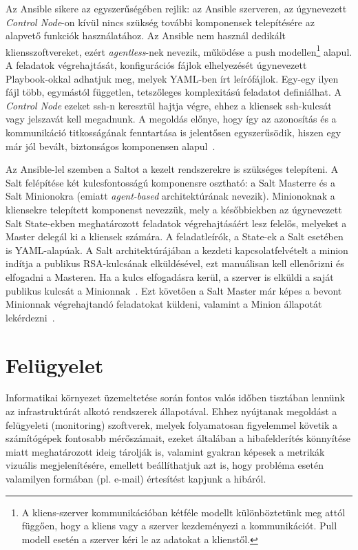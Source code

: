 Az Ansible sikere az egyszerűségében rejlik: az Ansible szerveren, az úgynevezett \textit{Control Node}-on kívül nincs szükség további komponensek telepítésére az alapvető funkciók használatához. Az Ansible nem használ dedikált kliensszoftvereket, ezért \textit{agentless}-nek nevezik, működése a push modellen\footnote{A kliens-szerver kommunikációban kétféle modellt különböztetünk meg attól függően, hogy a kliens vagy a szerver kezdeményezi a kommunikációt. Pull modell esetén a szerver kéri le az adatokat a klienstől.} alapul. A feladatok végrehajtását, konfigurációs fájlok elhelyezését úgynevezett Playbook-okkal adhatjuk meg, melyek YAML-ben írt leírófájlok. Egy-egy ilyen fájl több, egymástól független, tetszőleges komplexitású feladatot definiálhat. A \textit{Control Node} ezeket \acrshort{ssh}-n keresztül hajtja végre, ehhez a kliensek \acrshort{ssh}-kulcsát vagy jelszavát kell megadnunk. A megoldás előnye, hogy így az azonosítás és a kommunikáció titkosságának fenntartása is jelentősen egyszerűsödik, hiszen egy már jól bevált, biztonságos komponensen alapul~\cite{RedHatAnsibleVsSalt}.

Az Ansible-lel szemben a Saltot a kezelt rendszerekre is szükséges telepíteni. A Salt felépítése két kulcsfontosságú komponensre osztható: a Salt Masterre és a Salt Minionokra (emiatt \textit{agent-based} architektúrának nevezik). Minionoknak a kliensekre telepített komponenst nevezzük, mely a későbbiekben az úgynevezett Salt State-ekben meghatározott feladatok végrehajtásáért lesz felelős, melyeket a Master delegál ki a kliensek számára. A feladatleírók, a State-ek a Salt esetében is YAML-alapúak. A Salt architektúrájában a kezdeti kapcsolatfelvételt a minion indítja a publikus RSA-kulcsának elküldésével, ezt manuálisan kell ellenőrizni és elfogadni a Masteren. Ha a kulcs elfogadásra kerül, a szerver is elküldi a saját publikus kulcsát a Minionnak~\cite{SaltSecurity}. Ezt követően a Salt Master már képes a bevont Minionnak végrehajtandó feladatokat küldeni, valamint a Minion állapotát lekérdezni~\cite{RedHatAnsibleVsSalt}.

\section{Felügyelet}
\label{sect:monitoring}
Informatikai környezet üzemeltetése során fontos valós időben tisztában lennünk az infrastruktúrát alkotó rendszerek állapotával. Ehhez nyújtanak megoldást a felügyeleti (monitoring) szoftverek, melyek folyamatosan figyelemmel követik a számítógépek fontosabb mérőszámait, ezeket általában a hibafelderítés könnyítése miatt meghatározott ideig tárolják is, valamint gyakran képesek a metrikák vizuális megjelenítésére, emellett beállíthatjuk azt is, hogy probléma esetén valamilyen formában (pl. e-mail) értesítést kapjunk a hibáról.

